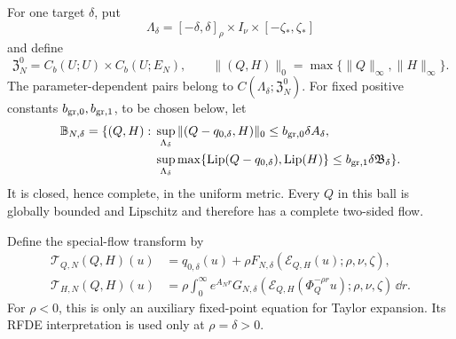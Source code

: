 For one target \(\delta\), put
\[
 \Lambda_\delta=[-\delta,\delta]_\rho\times I_\nu
                    \times[-\zeta_*,\zeta_*]
\]
and define
\[
 \mathfrak Z_N^0=C_b(U;U)\times C_b(U;E_N),
 \qquad
 \|(Q,H)\|_0=\max\{\|Q\|_\infty,\|H\|_\infty\}.
\]
The parameter-dependent pairs belong to
\(C(\Lambda_\delta;\mathfrak Z_N^0)\).  For fixed positive constants
\(b_{\rm gr,0},b_{\rm gr,1}\), to be chosen below, let
\begin{equation}
\begin{split}
 \mathbb B_{N,\delta}=\{(Q,H):{}&
 \sup_{\Lambda_\delta}\|(Q-q_{0,\delta},H)\|_0
       \leq b_{\rm gr,0}\delta A_\delta,\\
 &\sup_{\Lambda_\delta}
   \max\{\operatorname{Lip}(Q-q_{0,\delta}),
          \operatorname{Lip}(H)\}
       \leq b_{\rm gr,1}\delta\mathfrak B_\delta\}.
                                                               \label{eq:invdet-graph-ball}
\end{split}
\end{equation}
It is closed, hence complete, in the uniform metric.  Every \(Q\) in this
ball is globally bounded and Lipschitz and therefore has a complete
two-sided flow.

Define the special-flow transform by
\begin{align}
 \mathcal T_{Q,N}(Q,H)(u)
 &=q_{0,\delta}(u)+\rho F_{N,\delta}
       (\mathcal E_{Q,H}(u);\rho,\nu,\zeta),
                                                               \label{eq:invdet-TQ}\\
 \mathcal T_{H,N}(Q,H)(u)
 &=\rho\int_0^\infty e^{A_Nr}G_{N,\delta}
       (\mathcal E_{Q,H}(\Phi_Q^{-\rho r}u);
            \rho,\nu,\zeta)\,\dd r.               \label{eq:invdet-TH}
\end{align}
For \(\rho<0\), this is only an auxiliary fixed-point equation for Taylor
expansion.  Its RFDE interpretation is used only at \(\rho=\delta>0\).


